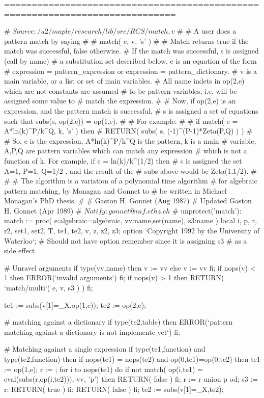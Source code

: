 =============================================================================

# $Source: /u2/maple/research/lib/src/RCS/match,v $
#	
#	A user does a pattern match by saying
#	
#	    match( e, v, 's' )
#	
#	Match returns true if the match was successful, false otherwise.
#	If the match was successful, s is assigned (call by name)
#	a substitution set described below.  e is an equation of the form
#	expression = pattern_expression or expression = pattern_dictionary.
#	v is a main variable, or a list or set of main variables.
#	All name indets in op(2,e) which are not constants are assumed
#	to be pattern variables, i.e. will be assigned some value to
#	match the expression.
#	
#	Now, if op(2,e) is an expression, and the pattern match is successful,
#	s is assigned a set of equations such that subs(s, op(2,e)) = op(1,e).
#	    
#	For example:
#	
#	   if match( e = A*ln(k)^P/k^Q, k, 's' ) then
#	        RETURN( subs( s, (-1)^(P-1)*Zeta(P,Q) ) )
#	
#	So, e is the expression, A*ln(k)^P/k^Q is the pattern, k is a main
#	variable, A,P,Q are pattern variables which can match any expression
#	which is not a function of k.  For example, if e = ln(k)/k^(1/2) then
#	s is assigned the set { A=1, P=1, Q=1/2 }, and the result of the
#	subs above would be Zeta(1,1/2).
#	
#
#	The algorithm is a variation of a polynomial time algorithm
#	for algebraic pattern matching, by Monagan and Gonnet to
#	be written in Michael Monagan's PhD thesis.
#
#					Gaston H. Gonnet (Aug 1987)
#				Updated Gaston H. Gonnet (Apr 1989)
#                                       $Notify: gonnet@inf.ethz.ch$
#
unprotect('match'):
match := proc( e:algebraic=algebraic, vv:{name,set(name)}, s3:name )
local i, p, r, r2, set1, set2, T, te1, te2, v, z, z2, z3;
option `Copyright 1992 by the University of Waterloo`;
# Should not have option remember since it is assigning s3
#  as a side effect

# Unravel arguments
if type(vv,name) then v := {vv} else v := vv fi;
if nops(v) < 1 then ERROR(`invalid arguments`) fi;
if nops(v) > 1 then RETURN( `match/multi`( e, v, s3 ) ) fi;

te1 := subs(v[1]=_X,op(1,e));
te2 := op(2,e);

# matching against a dictionary
if type(te2,table) then
    ERROR(`pattern matching against a dictionary is not implemente yet`) fi;

# Matching against a single expression
if type(te1,function) and type(te2,function) then
    if nops(te1) = nops(te2) and op(0,te1)=op(0,te2) then
	te1 := op(1,e);
	r := {};
	for i to nops(te1) do
	    if not match( op(i,te1) = eval(subs(r,op(i,te2))), vv, 'p') then
		RETURN( false ) fi;
	    r := r union p
	    od;
	s3 := r;  RETURN( true )
	fi;
    RETURN( false )
    fi;
te2 := subs(v[1]=_X,te2);


